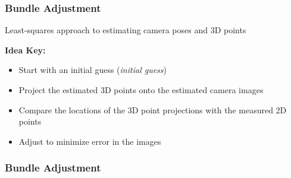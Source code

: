    \begin{frame}
   \frametitle{Bundle Adjustment}
   
   Least-squares approach to estimating camera poses and 3D points
   
   \textbf{Idea Key:}
   \begin{itemize}
   \item Start with an initial guess (\emph{initial guess})
   \item Project the estimated 3D points onto the estimated camera images
   \item Compare the locations of the 3D point projections with the measured 2D points
   \item Adjust to minimize error in the images
   \end{itemize}
   
   \end{frame}
   
   \begin{frame}
   \frametitle{Bundle Adjustment}
   
   
\end{frame}